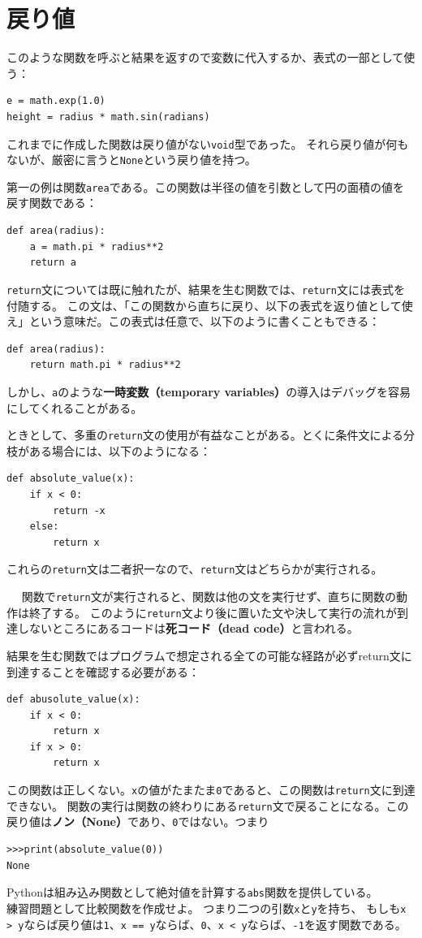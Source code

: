 \documentclass[a4j,12pt,makeidx]{jbook}
\begin{document}
\section{戻り値}
このような関数を呼ぶと結果を返すので変数に代入するか、表式の一部として使う：
\begin{verbatim}
e = math.exp(1.0)
height = radius * math.sin(radians)
\end{verbatim}
これまでに作成した関数は戻り値がない{\tt void}型であった。
それら戻り値が何もないが、厳密に言うと{\tt None}という戻り値を持つ。 \par
第一の例は関数{\tt area}である。この関数は半径の値を引数として円の面積の値を戻す関数である：
\begin{verbatim}
def area(radius):
    a = math.pi * radius**2
    return a
\end{verbatim}
{\tt return}文については既に触れたが、結果を生む関数では、{\tt return}文には表式を付随する。
この文は、「この関数から直ちに戻り、以下の表式を返り値として使え」という意味だ。この表式は任意で、以下のように書くこともできる：
\begin{verbatim}
def area(radius):
    return math.pi * radius**2
\end{verbatim}
しかし、{\tt a}のような{\bf 一時変数（temporary variables）}の導入はデバッグを容易にしてくれることがある。\par
ときとして、多重の{\tt return}文の使用が有益なことがある。とくに条件文による分枝がある場合には、以下のようになる：
\begin{verbatim}
def absolute_value(x):
    if x < 0:
        return -x
    else:
        return x
\end{verbatim}
これらの{\tt return}文は二者択一なので、{\tt return}文はどちらかが実行される。 \par　
関数で{\tt return}文が実行されると、関数は他の文を実行せず、直ちに関数の動作は終了する。
このように{\tt return}文より後に置いた文や決して実行の流れが到達しないところにあるコードは{\bf 死コード（dead code）}と言われる。\par
結果を生む関数ではプログラムで想定される全ての可能な経路が必ずreturn文に到達することを確認する必要がある：
\begin{verbatim}
def abusolute_value(x):
    if x < 0:
        return x
    if x > 0:
        return x
\end{verbatim}
この関数は正しくない。{\tt x}の値がたまたま{\tt 0}であると、この関数は{\tt return}文に到達できない。
関数の実行は関数の終わりにある{\tt return}文で戻ることになる。この戻り値は{\bf ノン（None）}であり、{\tt 0}ではない。つまり
\begin{verbatim}
>>>print(absolute_value(0))
None
\end{verbatim} \par
Pythonは組み込み関数として絶対値を計算する{\tt abs}関数を提供している。\\
練習問題として比較関数を作成せよ。
つまり二つの引数{\tt x}と{\tt y}を持ち、
もしも{\tt x > y}ならば戻り値は{\tt 1}、{\tt x == y}ならば、{\tt 0}、{\tt x < y}ならば、{\tt -1}を返す関数である。
%
\end{document}
